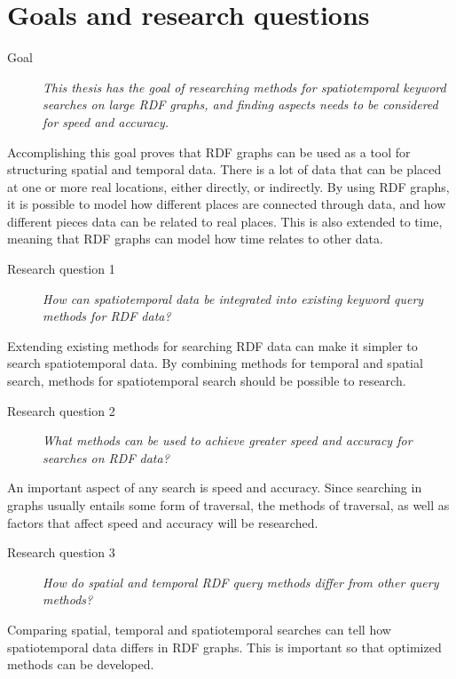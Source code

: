 \section{Goals and research questions}
\label{sec:Goals and Research Questions}
\begin{description}
    \item[Goal] {\em This thesis has the goal of researching methods for spatiotemporal keyword searches on large RDF graphs, and finding aspects needs to be considered for speed and accuracy.}
\end{description}
Accomplishing this goal proves that RDF graphs can be used as a tool for structuring spatial and temporal data. There is a lot of data that can be placed at one or more real locations, either directly, or indirectly. By using RDF graphs, it is possible to model how different places are connected through data, and how different pieces data can be related to real places. This is also extended to time, meaning that RDF graphs can model how time relates to other data.

\begin{description}
    \item[Research question 1] {\em How can spatiotemporal data be integrated into existing keyword query methods for RDF data?}
\end{description}
Extending existing methods for searching RDF data can make it simpler to search spatiotemporal data. By combining methods for temporal and spatial search, methods for spatiotemporal search should be possible to research.

\begin{description}
    \item[Research question 2] {\em What methods can be used to achieve greater speed and accuracy for searches on RDF data?}
\end{description}
An important aspect of any search is speed and accuracy. Since searching in graphs usually entails some form of traversal, the methods of traversal, as well as factors that affect speed and accuracy will be researched.

\begin{description}
    \item[Research question 3] {\em How do spatial and temporal RDF query methods differ from other query methods?}
\end{description}
Comparing spatial, temporal and spatiotemporal searches can tell how spatiotemporal data differs in RDF graphs. This is important so that optimized methods can be developed.

